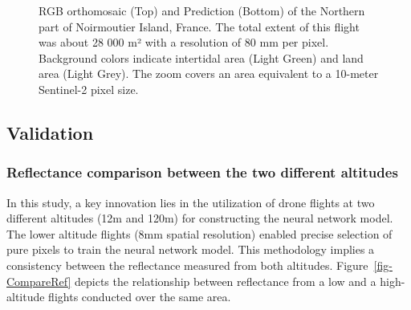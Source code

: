 \documentclass[
  number]{elsarticle}
\begin{document}
\label{cell-fig-Dike}
\begin{figure}[H]


\caption{\label{fig-Dike}RGB orthomosaic (Top) and Prediction (Bottom)
of the Northern part of Noirmoutier Island, France. The total extent of
this flight was about 28 000 m² with a resolution of 80 mm per pixel.
Background colors indicate intertidal area (Light Green) and land area
(Light Grey). The zoom covers an area equivalent to a 10-meter
Sentinel-2 pixel size.}

\end{figure}%

\subsection{Validation}\label{validation-1}

\subsubsection{Reflectance comparison between the two different
altitudes}\label{reflectance-comparison-between-the-two-different-altitudes}

In this study, a key innovation lies in the utilization of drone flights
at two different altitudes (12m and 120m) for constructing the neural
network model. The lower altitude flights (8mm spatial resolution)
enabled precise selection of pure pixels to train the neural network
model. This methodology implies a consistency between the reflectance
measured from both altitudes. Figure~\ref{fig-CompareRef} depicts the
relationship between reflectance from a low and a high-altitude flights
conducted over the same area.
\end{document}
